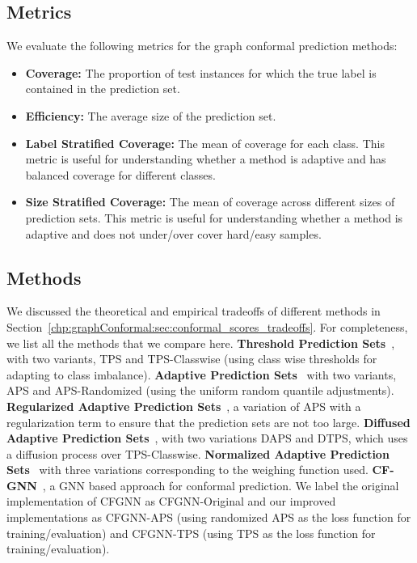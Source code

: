 \subsection{Metrics}
We evaluate the following metrics for the graph conformal prediction methods:
\begin{itemize}
    \item \textbf{Coverage:} The proportion of test instances for which the true label is contained in the prediction set.
    \item \textbf{Efficiency:} The average size of the prediction set.
    \item \textbf{Label Stratified Coverage:} The mean of coverage for each class. This metric is useful for understanding whether a method is adaptive and has balanced coverage for different classes.
    \item \textbf{Size Stratified Coverage:} The mean of coverage across different sizes of prediction sets. This metric is useful for understanding whether a method is adaptive and does not under/over cover hard/easy samples.
\end{itemize}

\subsection{Methods}
We discussed the theoretical and empirical tradeoffs of different methods in Section~\ref{chp:graphConformal:sec:conformal_scores_tradeoffs}.
For completeness, we list all the methods that we compare here.
\textbf{Threshold Prediction Sets}~\cite{sadinle2019least}, with two variants, TPS and TPS-Classwise (using class wise thresholds for adapting to class imbalance).
\textbf{Adaptive Prediction Sets}~\cite{romano2020classification} with two variants, APS and APS-Randomized (using the uniform random quantile adjustments).
\textbf{Regularized Adaptive Prediction Sets}~\cite{angelopoulos2021uncertainty}, a variation of APS with a regularization term to ensure that the prediction sets are not too large.
\textbf{Diffused Adaptive Prediction Sets}~\cite{zargarbashi23conformal}, with two variations DAPS and DTPS, which uses a diffusion process over TPS-Classwise.
\textbf{Normalized Adaptive Prediction Sets}~\cite{clarkson2023distribution} with three variations corresponding to the weighing function used.
\textbf{CF-GNN}~\cite{huang2024uncertainty}, a GNN based approach for conformal prediction. We label the original implementation of CFGNN as CFGNN-Original and our improved implementations as CFGNN-APS (using randomized APS as the loss function for training/evaluation) and CFGNN-TPS (using TPS as the loss function for training/evaluation).

